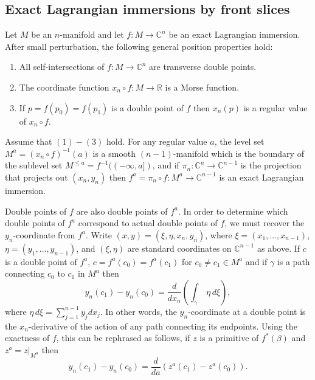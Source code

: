 \documentclass[reqno,11pt]{amsart}
\numberwithin{equation}{section}
\theoremstyle{my}
\theoremstyle{my}
\theoremstyle{your}
\newcommand{\R}{\mathbb{R}}
\newcommand{\C}{\mathbb{C}}
\begin{document}
\subsection{Exact Lagrangian immersions by front slices}\label{ssec:frontslice}
Let $M$ be an $n$-manifold and let $f\colon M\to\C^{n}$ be an exact Lagrangian immersion. 
After small perturbation, the following general position properties hold:
\begin{enumerate}
\item All self-intersections of $f\colon M\to\C^{n}$ are transverse double points.
\item The coordinate function $x_n\circ f\colon M\to\R$ is a Morse function.
\item If $p=f(p_0)=f(p_1)$ is a double point of $f$ then $x_n(p)$ is a regular value of $x_{n}\circ f$. 
\end{enumerate}
Assume that $(1)-(3)$ hold. For any regular value $a$, the level set $M^{a}=(x_n\circ f)^{-1}(a)$ is a smooth $(n-1)$-manifold which is the boundary of the sublevel set $M^{\le a}=f^{-1}((-\infty,a])$, and if $\pi_n\colon \C^{n}\to \C^{n-1}$ is the projection that projects out $(x_n,y_n)$ then $f^{a}=\pi_n\circ f\colon M^{a}\to\C^{n-1}$ is an exact Lagrangian immersion. 

Double points of $f$ are also double points of $f^{a}$. In order to determine which double points of $f^{a}$ correspond to actual double points of $f$, we must recover the $y_{n}$-coordinate from $f^{a}$. Write $(x,y)=(\xi,\eta,x_n,y_n)$, where $\xi=(x_1,\dots,x_{n-1})$, $\eta=(y_{1},\dots,y_{n-1})$, and $(\xi,\eta)$ are standard coordinates on $\C^{n-1}$ as above. 
If $c$ is a double point of $f^{a}$, $c=f^{a}(c_0)=f^{a}(c_1)$ for $c_{0}\ne c_{1}\in M^{a}$ and if $\gamma$ is a path connecting $c_0$ to $c_1$ in $M^{a}$ then 
\[
y_n(c_1)-y_{n}(c_0)=\frac{d}{d x_n}\left(\int_{\gamma}\; \eta\, d\xi \right),
\]  
where $\eta\, d\xi=\sum_{j=1}^{n-1}y_j dx_j$. In other words, the $y_{n}$-coordinate at a double point is the $x_{n}$-derivative of the action of any path connecting its endpoints. Using the exactness of $f$, this can be rephrased as follows, if $z$ is a primitive of $f^{\ast}(\beta)$ and $z^{a}=z|_{M^{a}}$ then
\begin{equation}\label{eq:slicechord}
y_n(c_1)-y_{n}(c_0)=\frac{d}{d a}\left(z^{a}(c_1)-z^{a}(c_0)\right).
\end{equation}
\end{document}
